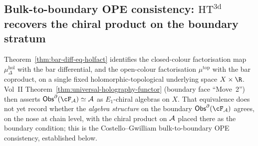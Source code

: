 \subsection{Bulk-to-boundary OPE consistency: $\mathrm{HT}^{3\mathrm{d}}$
recovers the chiral product on the boundary stratum}
\label{subsec:bulk-boundary-OPE-consistency}

Theorem~\ref{thm:bar-diff-eq-holfact} identifies the closed-colour
factorisation map $\mu^{\mathrm{hol}}_\Delta$ with the bar
differential, and the open-colour factorisation
$\mu^{\mathrm{top}}$ with the bar coproduct, on a single fixed
holomorphic-topological underlying space $X \times \R$. Vol~II
Theorem~\ref{thm:universal-holography-functor} (boundary face
``Move~2'') then asserts $\Obs^\partial(\cF_\cA) \simeq \cA$ as
$E_1$-chiral algebras on $X$. That equivalence does not yet record
whether the \emph{algebra structure} on the boundary
$\Obs^\partial(\cF_\cA)$ agrees, on the nose at chain level, with the
chiral product on $\mathcal{A}$ placed there as the boundary condition; this
is the Costello--Gwilliam bulk-to-boundary OPE consistency,
established below.

